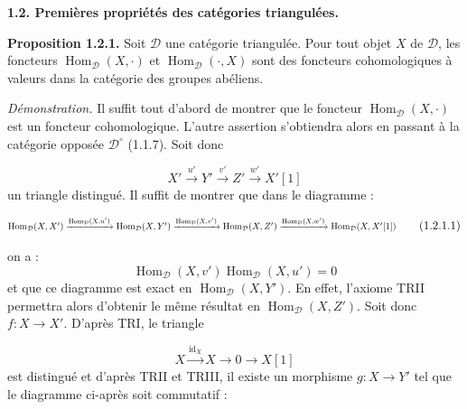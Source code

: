 %
\begingroup
\small
\setlength{\abovedisplayskip}{4pt plus 2pt minus 2pt}%
\setlength{\belowdisplayskip}{4pt plus 2pt minus 2pt}%

\medskip
\noindent\textbf{1.2. Premières propriétés des catégories triangulées.}

\medskip
\noindent\textbf{Proposition 1.2.1.}\quad
Soit $\mathcal D$ une catégorie triangulée. Pour tout objet $X$ de
$\mathcal D$, les foncteurs $\operatorname{Hom}_{\mathcal D}(X,\mathord\cdot)$
et $\operatorname{Hom}_{\mathcal D}(\mathord\cdot,X)$ sont des foncteurs
cohomologiques à valeurs dans la catégorie des groupes abéliens.

\noindent\emph{Démonstration.}\quad
Il suffit tout d'abord de montrer que le foncteur
$\operatorname{Hom}_{\mathcal D}(X,\mathord\cdot)$ est un foncteur
cohomologique. L'autre assertion s'obtiendra alors en passant à la catégorie
opposée $\mathcal D^\circ$ (1.1.7). Soit donc

\[
  X'\xrightarrow{u'}Y'\xrightarrow{v'}Z'\xrightarrow{w'}X'[1]
\]
un triangle distingué. Il suffit de montrer que dans le diagramme :

\begin{equation}
  \resizebox{0.98\linewidth}{!}{$
    \operatorname{Hom}_{\mathcal D}(X,X')
    \xrightarrow{\operatorname{Hom}_{\mathcal D}(X,u')}
    \operatorname{Hom}_{\mathcal D}(X,Y')
    \xrightarrow{\operatorname{Hom}_{\mathcal D}(X,v')}
    \operatorname{Hom}_{\mathcal D}(X,Z')
    \xrightarrow{\operatorname{Hom}_{\mathcal D}(X,w')}
    \operatorname{Hom}_{\mathcal D}(X,X'[1])
  $}
  \tag{1.2.1.1}
\end{equation}

on a :
\[
  \operatorname{Hom}_{\mathcal D}(X,v')
  \operatorname{Hom}_{\mathcal D}(X,u')=0
\]
et que ce diagramme est exact en $\operatorname{Hom}_{\mathcal D}(X,Y')$.
En effet, l'axiome TRII permettra alors d'obtenir le même résultat en
$\operatorname{Hom}_{\mathcal D}(X,Z')$. Soit donc $f\colon X\longrightarrow X'$.
D'après TRI, le triangle

\[
  X\xrightarrow{\operatorname{id}_X}X\longrightarrow0\longrightarrow X[1]
\]
est distingué et d'après TRII et TRIII, il existe un morphisme
$g\colon X\longrightarrow Y'$ tel que le diagramme ci-après soit commutatif :

